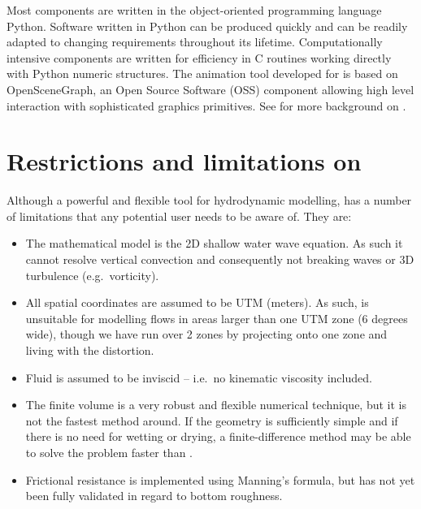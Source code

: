 \documentclass{manual}
\begin{document}
Most \anuga components are written in the object-oriented programming
language Python.  Software written in Python can be produced quickly
and can be readily adapted to changing requirements throughout its
lifetime.  Computationally intensive components are written for
efficiency in C routines working directly with Python numeric
structures.  The animation tool developed for \anuga is based on
OpenSceneGraph, an Open Source Software (OSS) component allowing high
level interaction with sophisticated graphics primitives.
See \cite{nielsen2005} for more background on \anuga.

\chapter{Restrictions and limitations on \anuga}
\label{ch:limitations}

Although a powerful and flexible tool for hydrodynamic modelling, \anuga has a
number of limitations that any potential user needs to be aware of. They are:

\begin{itemize}
  \item The mathematical model is the 2D shallow water wave equation.
  As such it cannot resolve vertical convection and consequently not breaking
  waves or 3D turbulence (e.g.\ vorticity).
  \item All spatial coordinates are assumed to be UTM (meters). As such,
  \anuga is unsuitable for modelling flows in areas larger than one UTM zone
  (6 degrees wide), though we have run over 2 zones by projecting onto one zone and 
  living with the distortion.
  \item Fluid is assumed to be inviscid -- i.e.\ no kinematic viscosity included.
  \item The finite volume is a very robust and flexible numerical technique,
  but it is not the fastest method around. If the geometry is sufficiently
  simple and if there is no need for wetting or drying, a finite-difference
  method may be able to solve the problem faster than \anuga.
  \item Frictional resistance is implemented using Manning's formula, but
  \anuga has not yet been fully validated in regard to bottom roughness.
\end{itemize}
\end{document}
